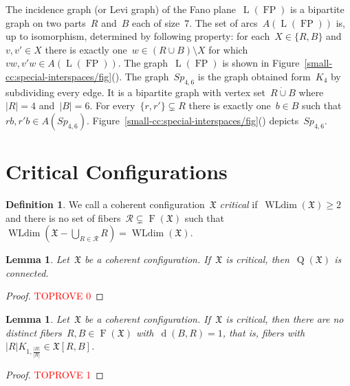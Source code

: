 \documentclass[english,a4paper]{article}
\theoremstyle{plain}
\newtheorem{lemma}      [theorem]{Lemma}
\theoremstyle{definition}
\newtheorem{definition} [theorem]{Definition}
\newcommand{\abs}[1]{| #1 |}
\newcommand{\disjointUnion}{\ensuremath{\mathbin{\dot{\cup}}}}
\DeclareMathOperator{\Fibers}{F}
\newcommand{\coherentConfig}{\ensuremath{\mathfrak{X}}}
\newcommand{\fibers}[1]{\ensuremath{\Fibers \left( #1 \right)}}
\newcommand{\interspace}[2]{\ensuremath{\coherentConfig[#1,#2]}}
\newcommand{\minimalDegree}[2]{\Deg(#1,#2)}
\newcommand{\arcs}{\ensuremath{A}}
\DeclareMathOperator*{\WLdim}{WLdim}
\newcommand{\wldim}[1]{\ensuremath{\WLdim\left(#1\right)}}
\DeclareMathOperator*{\Quotient}{Q}
\newcommand{\quotientGraph}[1]{\ensuremath{\Quotient(#1)}}
\DeclareMathOperator{\Deg}{d}
\newcommand{\clique}[1]{\ensuremath{K_{#1}}}
\newcommand{\disjointCliques}[2]{\ensuremath{#1 \clique{#2}}}
\DeclareMathOperator{\fanoPlane}{FP}
\DeclareMathOperator{\LeviGraph}{L}
\newcommand{\leviGraph}[1]{\ensuremath{\LeviGraph\!\left(#1\right)}}
\newcommand{\leviFano}{\leviGraph{\fanoPlane}}
\newcommand{\interspaceFourSix}{\ensuremath{Sp_{4,6}}}
\begin{document}
The incidence graph (or Levi graph) of the Fano plane~$\leviFano$ is a bipartite graph on two parts~$R$ and~$B$ each of size~$7$.
The set of arcs~$\arcs(\leviFano)$ is, up to isomorphism, determined by following property:
for each~$X \in \{R,B\}$ and~$v,v'\in X$ there is exactly one~$w \in (R \cup B) \setminus X$ for which~$vw,v'w \in \arcs(\leviFano)$.
The graph~$\leviFano$ is shown in Figure~\ref{small-cc:special-interspaces/fig}().
The graph~$\interspaceFourSix$ is the graph obtained form~$K_4$ by subdividing every edge.
It is a bipartite graph with vertex set~$R \disjointUnion B$ where~$\abs{R} = 4$ and~$\abs{B} = 6$.
For every~$\{r,r'\} \subsetneq R$ there is exactly one~$b \in B$ such that~$rb,r'b \in \arcs(\interspaceFourSix)$.
Figure~\ref{small-cc:special-interspaces/fig}() depicts~$\interspaceFourSix$.

 

\section{Critical Configurations}
\label{critical-graph/sec}

\begin{definition}
\label{def:critical-graph}
    We call a coherent configuration~$\coherentConfig$ \emph{critical} if~$\wldim{\coherentConfig}\geq 2$ and  there is no set of fibers~$\mathcal{R} \subsetneq \fibers{\coherentConfig}$ such that~$\wldim{\coherentConfig - \bigcup_{R \in \mathcal{R}} R} = \wldim{\coherentConfig}$.
\end{definition}


\begin{lemma}
\label{crictial:quotientGraph-connected/lem} \label{critical:disjoint-union/lem}
    Let~$\coherentConfig$ be a coherent configuration.
    If~$\coherentConfig$ is critical, then~$\quotientGraph{\coherentConfig}$ is connected.
\end{lemma}
\begin{proof}\textcolor{red}{TOPROVE 0}\end{proof}


\begin{lemma}
\label{critical:star/lem}
    Let~$\coherentConfig$ be a coherent configuration.
    If~$\coherentConfig$ is critical, then there are no distinct fibers~$R,B \in \fibers{\coherentConfig}$ with~$\minimalDegree{B}{R}=1$, that is, fibers with~$\disjointCliques{\abs{R}}{1,\frac{\abs{B}}{\abs{R}}} \in \interspace{R}{B}$.
\end{lemma}
\begin{proof}\textcolor{red}{TOPROVE 1}\end{proof}
\end{document}
